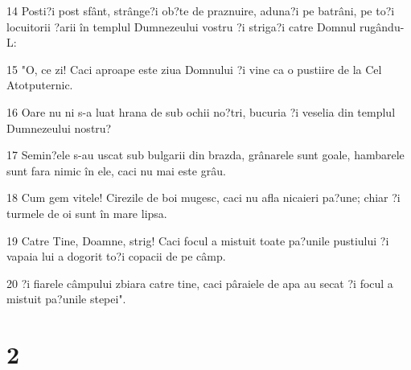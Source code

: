 \par 14 Posti?i post sfânt, strânge?i ob?te de praznuire, aduna?i pe batrâni, pe to?i locuitorii ?arii în templul Dumnezeului vostru ?i striga?i catre Domnul rugându-L:
\par 15 "O, ce zi! Caci aproape este ziua Domnului ?i vine ca o pustiire de la Cel Atotputernic.
\par 16 Oare nu ni s-a luat hrana de sub ochii no?tri, bucuria ?i veselia din templul Dumnezeului nostru?
\par 17 Semin?ele s-au uscat sub bulgarii din brazda, grânarele sunt goale, hambarele sunt fara nimic în ele, caci nu mai este grâu.
\par 18 Cum gem vitele! Cirezile de boi mugesc, caci nu afla nicaieri pa?une; chiar ?i turmele de oi sunt în mare lipsa.
\par 19 Catre Tine, Doamne, strig! Caci focul a mistuit toate pa?unile pustiului ?i vapaia lui a dogorit to?i copacii de pe câmp.
\par 20 ?i fiarele câmpului zbiara catre tine, caci pâraiele de apa au secat ?i focul a mistuit pa?unile stepei".

\chapter{2}

